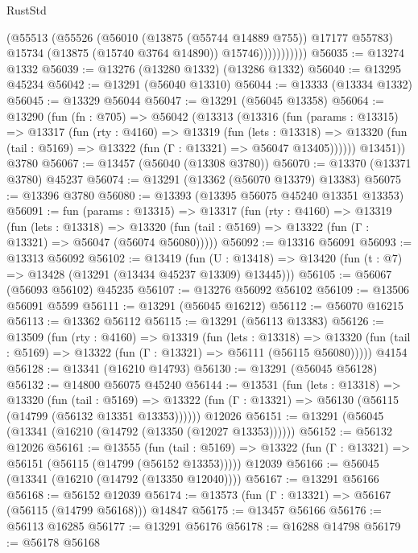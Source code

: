 \begin{lexlean}{RustStd}
\begin{coremodule}
                      (@55513
                        (@55526
                          (@56010 (@13875 (@55744 @14889 @755)) @17177 @55783)
                          @15734
                          (@13875 (@15740 @3764 @14890))
                          @15746)))))))))))
@56035 := @13274 @1332
@56039 := @13276 (@13280 @1332) (@13286 @1332)
@56040 := @13295 @45234
@56042 := @13291 (@56040 @13310)
@56044 := @13333 (@13334 @1332)
@56045 := @13329 @56044
@56047 := @13291 (@56045 @13358)
@56064 := @13290
    (fun (fn : @705) =>
    @56042
      (@13313
        (@13316
          (fun (params : @13315) =>
          @13317
            (fun (rty : @4160) =>
            @13319
              (fun (lets : @13318) =>
              @13320 (fun (tail : @5169) => @13322 (fun (Γ : @13321) => @56047 @13405))))))
        @13451))
    @3780
@56067 := @13457 (@56040 (@13308 @3780))
@56070 := @13370 (@13371 @3780) @45237
@56074 := @13291 (@13362 (@56070 @13379) @13383)
@56075 := @13396 @3780
@56080 := @13393 (@13395 @56075 @45240 @13351 @13353)
@56091 := fun (params : @13315) =>
  @13317
    (fun (rty : @4160) =>
    @13319
      (fun (lets : @13318) =>
      @13320 (fun (tail : @5169) => @13322 (fun (Γ : @13321) => @56047 (@56074 @56080)))))
@56092 := @13316 @56091
@56093 := @13313 @56092
@56102 := @13419
    (fun (U : @13418) => @13420 (fun (t : @7) => @13428 (@13291 (@13434 @45237 @13309) @13445)))
@56105 := @56067 (@56093 @56102) @45235
@56107 := @13276 @56092 @56102
@56109 := @13506 @56091 @5599
@56111 := @13291 (@56045 @16212)
@56112 := @56070 @16215
@56113 := @13362 @56112
@56115 := @13291 (@56113 @13383)
@56126 := @13509
    (fun (rty : @4160) =>
    @13319
      (fun (lets : @13318) =>
      @13320 (fun (tail : @5169) => @13322 (fun (Γ : @13321) => @56111 (@56115 @56080)))))
    @4154
@56128 := @13341 (@16210 @14793)
@56130 := @13291 (@56045 @56128)
@56132 := @14800 @56075 @45240
@56144 := @13531
    (fun (lets : @13318) =>
    @13320
      (fun (tail : @5169) =>
      @13322 (fun (Γ : @13321) => @56130 (@56115 (@14799 (@56132 @13351 @13353))))))
    @12026
@56151 := @13291 (@56045 (@13341 (@16210 (@14792 (@13350 (@12027 @13353))))))
@56152 := @56132 @12026
@56161 := @13555
    (fun (tail : @5169) => @13322 (fun (Γ : @13321) => @56151 (@56115 (@14799 (@56152 @13353)))))
    @12039
@56166 := @56045 (@13341 (@16210 (@14792 (@13350 @12040))))
@56167 := @13291 @56166
@56168 := @56152 @12039
@56174 := @13573 (fun (Γ : @13321) => @56167 (@56115 (@14799 @56168))) @14847
@56175 := @13457 @56166
@56176 := @56113 @16285
@56177 := @13291 @56176
@56178 := @16288 @14798
@56179 := @56178 @56168

\end{coremodule}
\end{lexlean}
